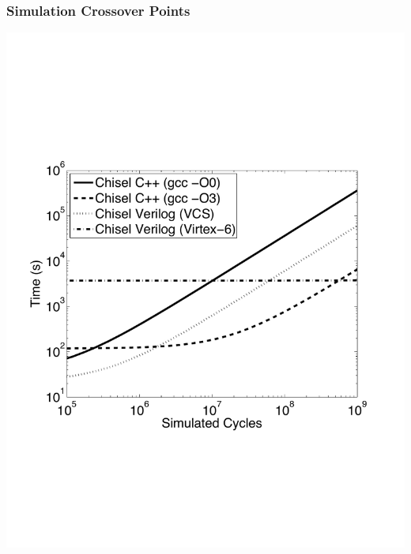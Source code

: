 \documentclass[xcolor=pdflatex,dvipsnames,table]{beamer}
\begin{document}
\ifx\poster\undefined
\begin{frame}
\frametitle{Simulation Crossover Points}

% 

\begin{center}
\includegraphics[height=0.8\textheight]{figs/perf.pdf}
\end{center}


\end{frame}
\fi
\end{document}
